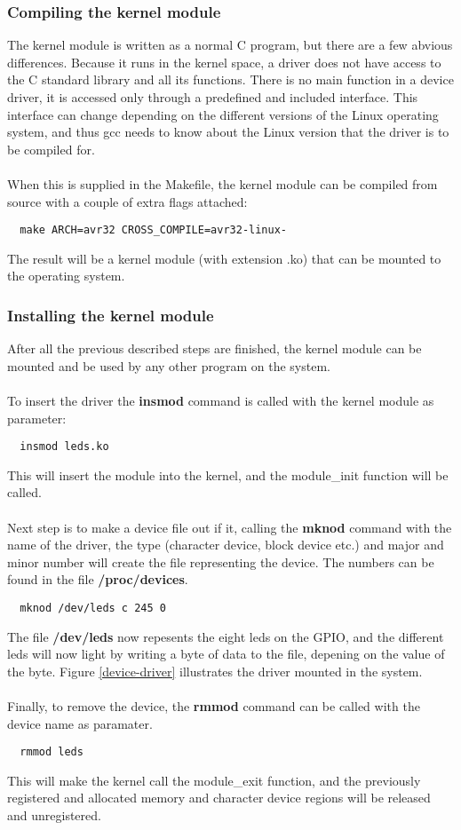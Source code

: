 \subsubsection{Compiling the kernel module}
The kernel module is written as a normal C program, but there are a few
abvious differences. Because it runs in the kernel space, a driver
does not have access to the C standard library and all its functions.
There is no main function in a device driver, it is accessed only
through a predefined and included interface. This interface can change
depending on the different versions of the Linux operating system, and
thus gcc needs to know about the Linux version that the driver is to be
compiled for.\\
\\
When this is supplied in the Makefile, the kernel module can be compiled
from source with a couple of extra flags attached:
\begin{verbatim}
  make ARCH=avr32 CROSS_COMPILE=avr32-linux-
\end{verbatim}
The result will be a kernel module (with extension .ko) that can be
mounted to the operating system.

\subsubsection{Installing the kernel module}
After all the previous described steps are finished, the kernel
module can be mounted and be used by any other program on the system.\\
\\
To insert the driver the \textbf{insmod} command is called with the
kernel module as parameter:
\begin{verbatim}
  insmod leds.ko
\end{verbatim}
This will insert the module into the kernel, and the module\_init
function will be called.\\
\\
Next step is to make a device file out if it, calling the
\textbf{mknod} command with the name of the driver,
the type (character device, block device etc.)
and major and minor number will create the file representing the device.
The numbers can be found in the file {\bf /proc/devices}.
\begin{verbatim}
  mknod /dev/leds c 245 0
\end{verbatim}
The file \textbf{/dev/leds} now repesents the eight leds on the GPIO,
and the different leds will now light by writing a byte
of data to the file, depening on the value of the byte.
Figure \ref{device-driver} illustrates the driver mounted in the
system.\\
\\
Finally, to remove the device, the \textbf{rmmod} command can be called
with the device name as paramater.
\begin{verbatim}
  rmmod leds
\end{verbatim}
This will make the kernel call the module\_exit function, and the
previously registered and allocated memory and character device regions
will be released and unregistered.
